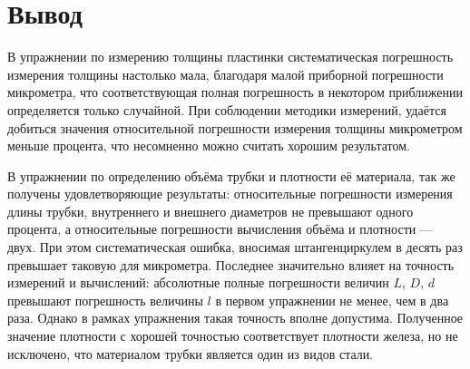 \section{Вывод}

В упражнении по измерению толщины пластинки систематическая погрешность измерения толщины настолько мала, благодаря малой приборной погрешности микрометра, что соответствующая полная погрешность в некотором приближении определяется только случайной. При соблюдении методики измерений, удаётся добиться значения относительной погрешности измерения толщины микрометром меньше процента, что несомненно можно считать хорошим результатом.

В упражнении по определению объёма трубки и плотности её материала, так же получены удовлетворяющие результаты: относительные погрешности измерения длины трубки, внутреннего и внешнего диаметров не превышают одного процента, а относительные погрешности вычисления объёма и плотности --- двух. При этом систематическая ошибка, вносимая штангенциркулем в десять раз превышает таковую для микрометра. Последнее значительно влияет на точность измерений и вычислений: абсолютные полные погрешности величин $L$, $D$, $d$ превышают погрешность величины $l$ в первом упражнении не менее, чем в два раза. Однако в рамках упражнения такая точность вполне допустима. Полученное значение плотности с хорошей точностью соответствует плотности железа, но не исключено, что материалом трубки является один из видов стали.
